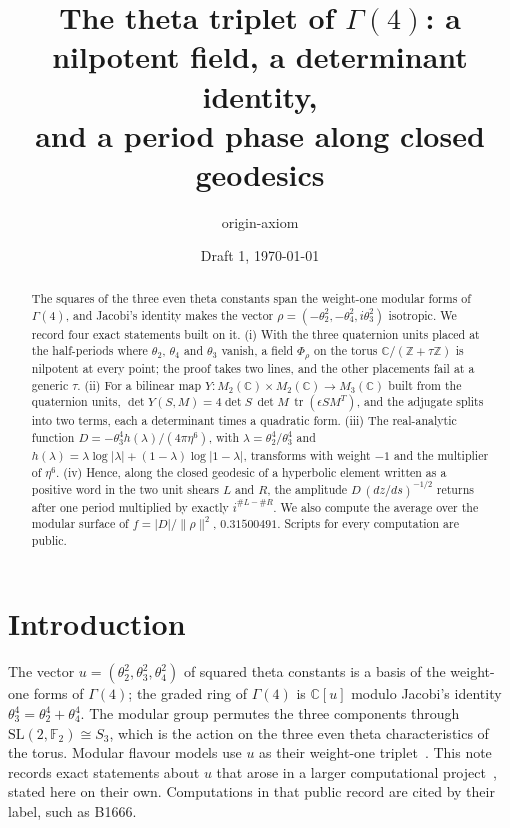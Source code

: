 \documentclass[11pt]{article}
\title{The theta triplet of $\Gamma(4)$: a nilpotent field, a determinant identity,\\ and a period phase along closed geodesics}
\author{origin-axiom}
\date{Draft 1, \today}
\theoremstyle{remark}
\newcommand{\SL}{\mathrm{SL}}
\newcommand{\Z}{\mathbb{Z}}
\newcommand{\C}{\mathbb{C}}
\newcommand{\tr}{\operatorname{tr}}
\begin{document}
\maketitle

\begin{abstract}
The squares of the three even theta constants span the weight-one modular forms of $\Gamma(4)$, and Jacobi's identity
makes the vector $\rho=(-\theta_2^2,-\theta_4^2,i\theta_3^2)$ isotropic. We record four exact statements built on it.
(i) With the three quaternion units placed at the half-periods where $\theta_2$, $\theta_4$ and $\theta_3$ vanish, a field
$\Phi_\rho$ on the torus $\C/(\Z+\tau\Z)$ is nilpotent at every point; the proof takes two lines, and the other placements
fail at a generic $\tau$. (ii) For a bilinear map $Y:M_2(\C)\times M_2(\C)\to M_3(\C)$ built from the quaternion units,
$\det Y(S,M)=4\det S\,\det M\,\tr(\epsilon SM^T)$, and the adjugate splits into two terms, each a determinant times a quadratic
form. (iii) The real-analytic function $D=-\theta_3^4h(\lambda)/(4\pi\eta^6)$, with $\lambda=\theta_2^4/\theta_3^4$ and
$h(\lambda)=\lambda\log|\lambda|+(1-\lambda)\log|1-\lambda|$, transforms with weight $-1$ and the multiplier of $\eta^6$.
(iv) Hence, along the closed geodesic of a hyperbolic element written as a positive word in the two unit shears $L$ and
$R$, the amplitude $D\,(dz/ds)^{-1/2}$ returns after one period multiplied by exactly $i^{\#L-\#R}$. We also compute the
average over the modular surface of $f=|D|/\|\rho\|^2$, $0.31500491$. Scripts for every computation are public.
\end{abstract}

\section{Introduction}

The vector $u=(\theta_2^2,\theta_3^2,\theta_4^2)$ of squared theta constants is a basis of the weight-one forms of
$\Gamma(4)$; the graded ring of $\Gamma(4)$ is $\C[u]$ modulo Jacobi's identity $\theta_3^4=\theta_2^4+\theta_4^4$. The
modular group permutes the three components through $\SL(2,\mathbb F_2)\cong S_3$, which is the action on the three even
theta characteristics of the torus. Modular flavour models use $u$ as their weight-one triplet~\cite{NovichkovPenedoPetcov2021,LiuYaoDing2020}.
This note records exact statements about $u$ that arose in a larger computational project~\cite{OriginAxiomRepo}, stated
here on their own. Computations in that public record are cited by their label, such as B1666.
\end{document}
